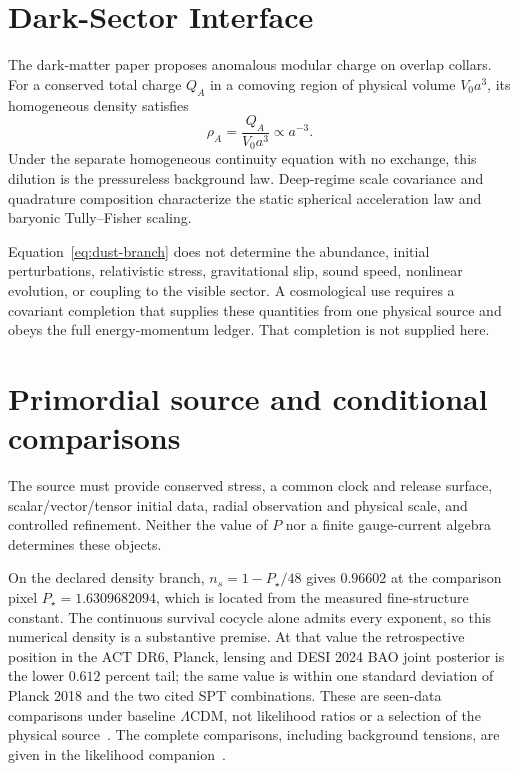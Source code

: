 \documentclass[11pt]{article}
\theoremstyle{remark}
\begin{document}
\section{Dark-Sector Interface}

The dark-matter paper proposes anomalous modular charge on overlap collars.
For a conserved total charge \(Q_A\) in a comoving region of physical volume
\(V_0a^3\), its homogeneous density satisfies
\begin{equation}
\rho_A=\frac{Q_A}{V_0a^3}\propto a^{-3}.
\label{eq:dust-branch}
\end{equation}
Under the separate homogeneous continuity equation with no exchange, this
dilution is the pressureless background law. Deep-regime scale covariance
and quadrature composition characterize the static spherical acceleration
law and baryonic Tully--Fisher scaling.

Equation~\eqref{eq:dust-branch} does not determine the abundance, initial
perturbations, relativistic stress, gravitational slip, sound speed, nonlinear
evolution, or coupling to the visible sector. A cosmological use requires a
covariant completion that supplies these quantities from one physical source and
obeys the full energy-momentum ledger. That completion is not supplied here.

\section{Primordial source and conditional comparisons}
\label{sec:public-comparison}
The source must provide conserved stress, a common clock and release
surface, scalar/vector/tensor initial data, radial observation and physical
scale, and controlled refinement. Neither the value of \(P\) nor a finite
gauge-current algebra determines these objects.

On the declared density branch, \(n_s=1-P_\star/48\) gives
\(0.96602\) at the comparison pixel \(P_\star=1.6309682094\), which is
located from the measured fine-structure constant. The continuous survival
cocycle alone admits every exponent, so this numerical density is a
substantive premise. At that value the retrospective position in the
ACT DR6, Planck, lensing and DESI 2024 BAO joint posterior is the lower
\(0.612\) percent tail; the same value is within one standard deviation of
Planck 2018 and the two cited SPT combinations. These are seen-data
comparisons under baseline \(\Lambda\)CDM, not likelihood ratios or a
selection of the physical source~\cite{act2025,ophpublicdata}.
The complete comparisons, including background tensions, are given in the
likelihood companion~\cite{ophcontracts}.
\end{document}
